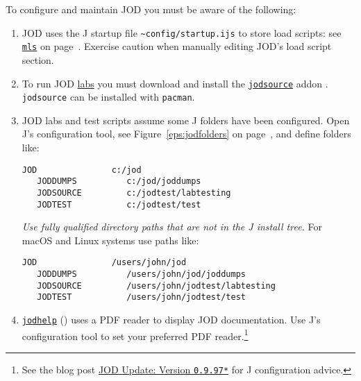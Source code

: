 To configure and maintain JOD you must be aware of the following:
\begin{enumerate}
	\item JOD uses the J startup file \verb|~config/startup.ijs| to store load scripts: see 
	\hyperlink{il:mls}{\texttt{mls}} on page~\pageref{ss:mls}.  Exercise caution when manually
	editing JOD's load script section.
	\item To run JOD \href{https://code.jsoftware.com/wiki/Labs/Migration}{labs} you must download and install the
	 \href{https://www.jsoftware.com/jwiki/Addons/general/jodsource}{\texttt{jodsource}} addon \cite{baker:jodsource}. 
	 \texttt{jodsource} can be installed with \texttt{pacman}.
	\item JOD labs and test scripts assume some J folders have been configured.  Open J's
	configuration tool, see Figure~\ref{eps:jodfolders} on 
   page~\pageref{eps:jodfolders}, and
	define folders like:
	\begin{lstlisting}[frame=single,framerule=0pt,label=lst:foldercfg]
   JOD               c:/jod
   JODDUMPS          c:/jod/joddumps
   JODSOURCE         c:/jodtest/labtesting
   JODTEST           c:/jodtest/test
  \end{lstlisting}
  \emph{Use fully qualified directory paths that are not in the J install tree.}
  For macOS and Linux systems use paths like:
  \begin{lstlisting}[frame=single,framerule=0pt,label=lst:foldercfgunix]
   JOD               /users/john/jod
   JODDUMPS          /users/john/jod/joddumps
   JODSOURCE         /users/john/jodtest/labtesting
   JODTEST           /users/john/jodtest/test
  \end{lstlisting}
  \item \hyperlink{il:jodhelp}{\texttt{jodhelp}} (\pageref{ss:jodhelp}) uses a 
  PDF reader to display JOD documentation. Use J's configuration tool to set 
  your preferred PDF reader.\footnote{See the blog post \href{https://bakerjd99.wordpress.com/2015/03/22/jod-update-version-0-9-97/}{JOD Update: Version \texttt{0.9.97*}} for J configuration advice.
  } 
\end{enumerate} 



